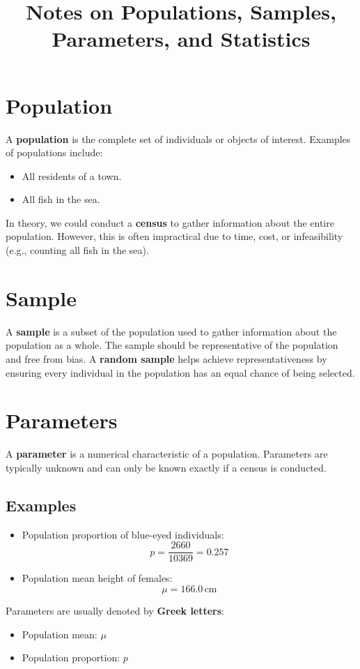 \documentclass{article}
\title{Notes on Populations, Samples, Parameters, and Statistics}
\author{}
\date{}
\begin{document}
\maketitle

\section{Population}
A \textbf{population} is the complete set of individuals or objects of interest. Examples of populations include:
\begin{itemize}
    \item All residents of a town.
    \item All fish in the sea.
\end{itemize}
In theory, we could conduct a \textbf{census} to gather information about the entire population. However, this is often impractical due to time, cost, or infeasibility (e.g., counting all fish in the sea).

\section{Sample}
A \textbf{sample} is a subset of the population used to gather information about the population as a whole. The sample should be representative of the population and free from bias. A \textbf{random sample} helps achieve representativeness by ensuring every individual in the population has an equal chance of being selected.

\section{Parameters}
A \textbf{parameter} is a numerical characteristic of a population. Parameters are typically unknown and can only be known exactly if a census is conducted.

\subsection{Examples}
\begin{itemize}
    \item Population proportion of blue-eyed individuals:
    \[
    p = \frac{2660}{10369} = 0.257
    \]
    \item Population mean height of females:
    \[
    \mu = 166.0 \, \text{cm}
    \]
\end{itemize}
Parameters are usually denoted by \textbf{Greek letters}:
\begin{itemize}
    \item Population mean: $\mu$
    \item Population proportion: $p$
\end{itemize}
\end{document}
